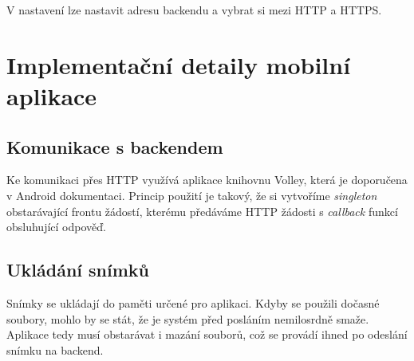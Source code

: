 V nastavení lze nastavit adresu backendu a vybrat si mezi HTTP a HTTPS.

\section{Implementační detaily mobilní aplikace}

\subsection{Komunikace s backendem}

\noindent
Ke komunikaci přes HTTP využívá aplikace knihovnu Volley, která je doporučena
v Android dokumentaci. Princip použití je takový, že si vytvoříme
\textit{singleton} obstarávající frontu žádostí, kterému předáváme HTTP žádosti s
\textit{callback} funkcí obsluhující odpověď. \citep[viz][]{Volley1}

\subsection{Ukládání snímků}

\noindent
Snímky se ukládají do paměti určené pro aplikaci. Kdyby se použili dočasné soubory,
mohlo by se stát, že je systém před posláním nemilosrdně smaže.
\citep[viz][]{AndroidMem}
Aplikace tedy musí obstarávat i mazání souborů, což se provádí
ihned po odeslání snímku na backend.
